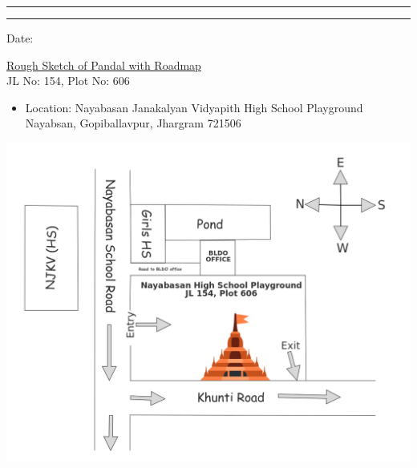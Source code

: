 \begin{center}
	\myheader
\end{center}

\hrule \vspace*{2pt} \hrule  \vspace*{20pt}
\begin{adjustwidth}{15mm}{15mm}\large 
	\begin{flushright} 
		Date: \underline{\datecontainer}
	\end{flushright}\large\vspace{1cm}
	
	\begin{center}
		 \underline{Rough Sketch of Pandal with Roadmap}\\[2ex]
		 
		 JL No: 154, Plot No: 606\\
	\end{center}

\begin{itemize}
	\item Location: Nayabasan Janakalyan Vidyapith High School Playground\\
	Nayabsan, Gopiballavpur, Jhargram 721506
\end{itemize}

\begin{center}
	\includegraphics[width=\linewidth]{image/diagram}
\end{center}
\end{adjustwidth}